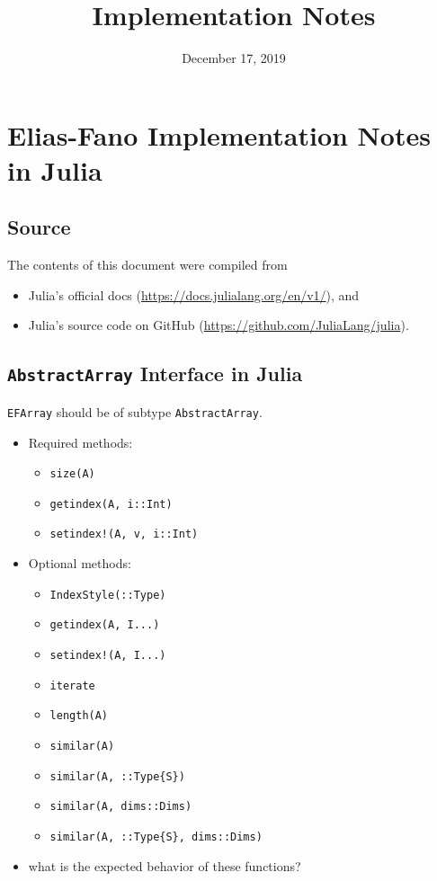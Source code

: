 \documentclass[10pt]{article}
\title{Implementation Notes}
\date{December 17, 2019}
\begin{document}
\maketitle

\section{Elias-Fano Implementation Notes in Julia}\label{ef-impl-julia}
\subsection{Source}\label{source}
The contents of this document were compiled from
\begin{itemize}
\item
    Julia's official docs (\url{https://docs.julialang.org/en/v1/}), and 
\item
    Julia's source code on GitHub (\url{https://github.com/JuliaLang/julia}).

\end{itemize}
\subsection{\texttt{AbstractArray} Interface in Julia}\label{abstract-array}
\texttt{EFArray} should be of subtype \texttt{AbstractArray}.
\begin{itemize}
\item
    Required methods:
    \begin{itemize}
    \item
        \texttt{size(A)}
    \item
        \texttt{getindex(A, i::Int)}
    \item
        \texttt{setindex!(A, v, i::Int)}
    \end{itemize}
\item
    Optional methods:
    \begin{itemize}
    \item
        \texttt{IndexStyle(::Type)}
    \item
        \texttt{getindex(A, I...)}
    \item
        \texttt{setindex!(A, I...)}
    \item
        \texttt{iterate}
    \item
        \texttt{length(A)}
    \item
        \texttt{similar(A)}
    \item
        \texttt{similar(A, ::Type\{S\})}
    \item
        \texttt{similar(A, dims::Dims)}
    \item
        \texttt{similar(A, ::Type\{S\}, dims::Dims)}
    \end{itemize}
\item
    \todo what is the expected behavior of these functions?
\end{itemize}
\end{document}
